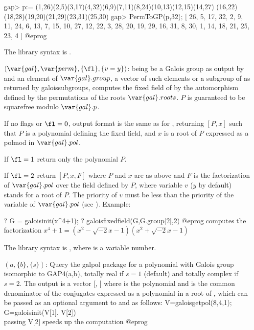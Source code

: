  gap> p:= (1,26)(2,5)(3,17)(4,32)(6,9)(7,11)(8,24)(10,13)(12,15)(14,27)
   (16,22)(18,28)(19,20)(21,29)(23,31)(25,30)
 gap> PermToGP(p,32);
 [ 26, 5, 17, 32, 2, 9, 11, 24, 6, 13, 7, 15, 10, 27, 12, 22, 3, 28, 20, 19,
   29, 16, 31, 8, 30, 1, 14, 18, 21, 25, 23, 4 ]
 @eprog

The library syntax is .

$(\var{gal},\var{perm},\{\fl\},\{v=y\})$: \label{se:galoisfixedfield} being be a Galois group as output by  and
 an element of $\var{gal}.group$, a vector of such elements
or a subgroup of  as returned by galoissubgroups,
computes the fixed field of  by the automorphism defined by the
permutations  of the roots $\var{gal}.roots$. $P$ is guaranteed to
be squarefree modulo $\var{gal}.p$.

If no flags or $\fl=0$, output format is the same as for ,
returning $[P,x]$ such that $P$ is a polynomial defining the fixed field, and
$x$ is a root of $P$ expressed as a polmod in $\var{gal}.pol$.

If $\fl=1$ return only the polynomial $P$.

If $\fl=2$ return $[P,x,F]$ where $P$ and $x$ are as above and $F$ is the
factorization of $\var{gal}.pol$ over the field defined by $P$, where
variable $v$ ($y$ by default) stands for a root of $P$. The priority of $v$
must be less than the priority of the variable of $\var{gal}.pol$ (see
). Example:

\bprog
? G = galoisinit(x^4+1);
? galoisfixedfield(G,G.group[2],2)
@eprog\noindent
computes the factorization  $x^4+1=(x^2-\sqrt{-2}x-1)(x^2+\sqrt{-2}x-1)$

The library syntax is , where  is a variable number.

$(a,\{b\},\{s\})$: \label{se:galoisgetpol}Query the galpol package for a polynomial with Galois group isomorphic to
GAP4(a,b), totally real if $s=1$ (default) and totally complex if $s=2$. The
output is a vector [, ] where  is the polynomial and
 is the common denominator of the conjugates expressed as a
polynomial in a root of , which can be passed as an optional argument
to  and  as follows:
\bprog
V=galoisgetpol(8,4,1);
G=galoisinit(V[1], V[2])  \\ passing V[2] speeds up the computation
@eprog


